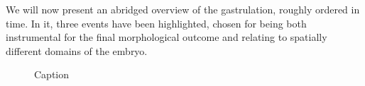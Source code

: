 We will now present an abridged overview of the gastrulation, roughly ordered in time. In it, three events have been highlighted, chosen for being both instrumental for the final morphological outcome and relating to spatially different domains of the embryo. 



\newpage

\begin{figure}[H]
    \centering
    \vspace*{-1cm}
    \caption{Caption}
    \label{fig:big-timeline}
\end{figure}
\newpage
\addtocounter{figure}{-1}
